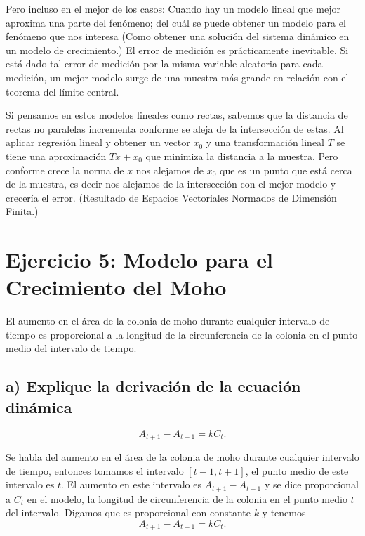 \documentclass[11pt]{article}
\begin{document}
Pero incluso en el mejor de los casos: Cuando hay un modelo lineal que
mejor aproxima una parte del fenómeno; del cuál se puede obtener un
modelo para el fenómeno que nos interesa (Como obtener una solución del
sistema dinámico en un modelo de crecimiento.) El error de medición es
prácticamente inevitable. Si está dado tal error de medición por la
misma variable aleatoria para cada medición, un mejor modelo surge de
una muestra más grande en relación con el teorema del límite central.

Si pensamos en estos modelos lineales como rectas, sabemos que la
distancia de rectas no paralelas incrementa conforme se aleja de la
intersección de estas. Al aplicar regresión lineal y obtener un vector
\(x_0\) y una transformación lineal \(T\) se tiene una aproximación
\(Tx+x_0\) que minimiza la distancia a la muestra. Pero conforme crece
la norma de \(x\) nos alejamos de \(x_0\) que es un punto que está cerca
de la muestra, es decir nos alejamos de la intersección con el mejor
modelo y crecería el error. (Resultado de Espacios Vectoriales Normados
de Dimensión Finita.)

    \hypertarget{ejercicio-5-modelo-para-el-crecimiento-del-moho}{%
\section*{Ejercicio 5: Modelo para el Crecimiento del
Moho}\label{ejercicio-5-modelo-para-el-crecimiento-del-moho}}

El aumento en el área de la colonia de moho durante cualquier intervalo
de tiempo es proporcional a la longitud de la circunferencia de la
colonia en el punto medio del intervalo de tiempo.

\hypertarget{a-explique-la-derivaciuxf3n-de-la-ecuaciuxf3n-dinuxe1mica}{%
\subsection*{a) Explique la derivación de la ecuación
dinámica}\label{a-explique-la-derivaciuxf3n-de-la-ecuaciuxf3n-dinuxe1mica}}

\[A_{t+1}-A_{t-1} = k C_t.\]

    Se habla del aumento en el área de la colonia de moho durante cualquier
intervalo de tiempo, entonces tomamos el intervalo \([t-1,t+1]\), el
punto medio de este intervalo es \(t\). El aumento en este intervalo es
\(A_{t+1}-A_{t-1}\) y se dice proporcional a \(C_t\) en el modelo, la
longitud de circunferencia de la colonia en el punto medio \(t\) del
intervalo. Digamos que es proporcional con constante \(k\) y tenemos
\[A_{t+1}-A_{t-1} = k C_t.\]
\end{document}
